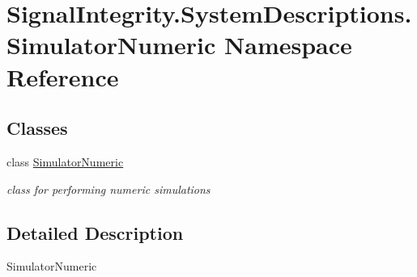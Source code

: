 \hypertarget{namespaceSignalIntegrity_1_1SystemDescriptions_1_1SimulatorNumeric}{}\section{Signal\+Integrity.\+System\+Descriptions.\+Simulator\+Numeric Namespace Reference}
\label{namespaceSignalIntegrity_1_1SystemDescriptions_1_1SimulatorNumeric}
\subsection*{Classes}
\begin{DoxyCompactItemize}
\item 
class \hyperlink{classSignalIntegrity_1_1SystemDescriptions_1_1SimulatorNumeric_1_1SimulatorNumeric}{Simulator\+Numeric}
\begin{DoxyCompactList}\small\item\em class for performing numeric simulations \end{DoxyCompactList}\end{DoxyCompactItemize}


\subsection{Detailed Description}
\begin{DoxyVerb}SimulatorNumeric\end{DoxyVerb}
 